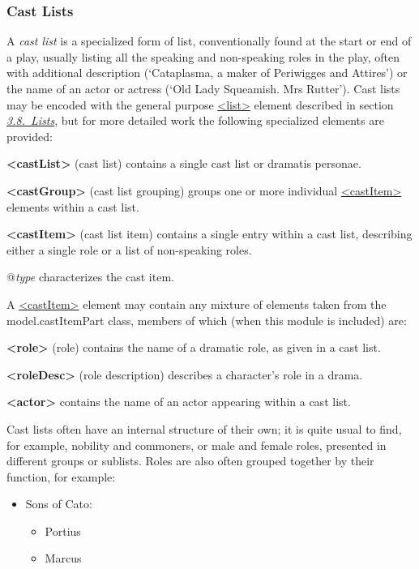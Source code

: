 \subsubsection[{Cast Lists}]{Cast Lists}\label{DRCAST}\par
A \textit{cast list} is a specialized form of list, conventionally found at the start or end of a play, usually listing all the speaking and non-speaking roles in the play, often with additional description (‘Cataplasma, a maker of Periwigges and Attires’) or the name of an actor or actress (‘Old Lady Squeamish. Mrs Rutter’). Cast lists may be encoded with the general purpose \hyperref[TEI.list]{<list>} element described in section \textit{\hyperref[COLI]{3.8.\ Lists}}, but for more detailed work the following specialized elements are provided: 
\begin{sansreflist}
  
\item [\textbf{<castList>}] (cast list) contains a single cast list or dramatis personae.
\item [\textbf{<castGroup>}] (cast list grouping) groups one or more individual \hyperref[TEI.castItem]{<castItem>} elements within a cast list.
\item [\textbf{<castItem>}] (cast list item) contains a single entry within a cast list, describing either a single role or a list of non-speaking roles.\hfil\\[-10pt]\begin{sansreflist}
    \item[@{\itshape type}]
  characterizes the cast item.
\end{sansreflist}  
\end{sansreflist}
\par
A \hyperref[TEI.castItem]{<castItem>} element may contain any mixture of elements taken from the \textsf{model.castItemPart} class, members of which (when this module is included) are: 
\begin{sansreflist}
  
\item [\textbf{<role>}] (role) contains the name of a dramatic role, as given in a cast list.
\item [\textbf{<roleDesc>}] (role description) describes a character's role in a drama.
\item [\textbf{<actor>}] contains the name of an actor appearing within a cast list.
\end{sansreflist}
 Cast lists often have an internal structure of their own; it is quite usual to find, for example, nobility and commoners, or male and female roles, presented in different groups or sublists. Roles are also often grouped together by their function, for example: \begin{itemize}
\item Sons of Cato: \mbox{}\\[-10pt] \begin{itemize}
\item Portius
\item Marcus
\end{itemize} 
\end{itemize} \par
